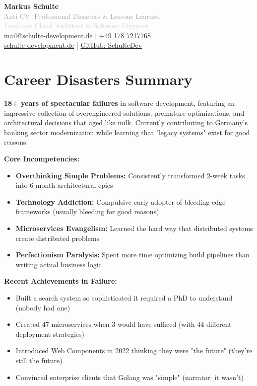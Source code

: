 \documentclass[10pt,a4paper]{article}
\begin{document}
\begin{center}
    {\Huge \textbf{Markus Schulte}}\\[0.3cm]
    {\Large \textcolor{darkgray}{Anti-CV: Professional Disasters \& Lessons Learned}}\\[0.5cm]
    \textcolor{lightgray}{Freelance Cloud Architect \& Software Engineer}\\[0.2cm]
    \href{mailto:mail@schulte-development.de}{mail@schulte-development.de} | +49 178 7217768\\
    \href{https://schulte-development.de}{schulte-development.de} | \href{https://github.com/SchulteDev}{GitHub: SchulteDev}
\end{center}

\vspace{0.3cm}

\section{Career Disasters Summary}

\textbf{18+ years of spectacular failures} in software development, featuring an impressive collection of overengineered solutions, premature optimizations, and architectural decisions that aged like milk. Currently contributing to Germany's banking sector modernization while learning that "legacy systems" exist for good reasons.

\textbf{Core Incompetencies:}
\begin{itemize}[leftmargin=*,itemsep=1pt]
    \item \textbf{Overthinking Simple Problems:} Consistently transformed 2-week tasks into 6-month architectural epics
    \item \textbf{Technology Addiction:} Compulsive early adopter of bleeding-edge frameworks (usually bleeding for good reasons)
    \item \textbf{Microservices Evangelism:} Learned the hard way that distributed systems create distributed problems
    \item \textbf{Perfectionism Paralysis:} Spent more time optimizing build pipelines than writing actual business logic
\end{itemize}

\textbf{Recent Achievements in Failure:}
\begin{itemize}[leftmargin=*,itemsep=1pt]
    \item Built a search system so sophisticated it required a PhD to understand (nobody had one)
    \item Created 47 microservices when 3 would have sufficed (with 44 different deployment strategies)
    \item Introduced Web Components in 2022 thinking they were "the future" (they're still the future)
    \item Convinced enterprise clients that Golang was "simple" (narrator: it wasn't)
\end{itemize}
\end{document}
